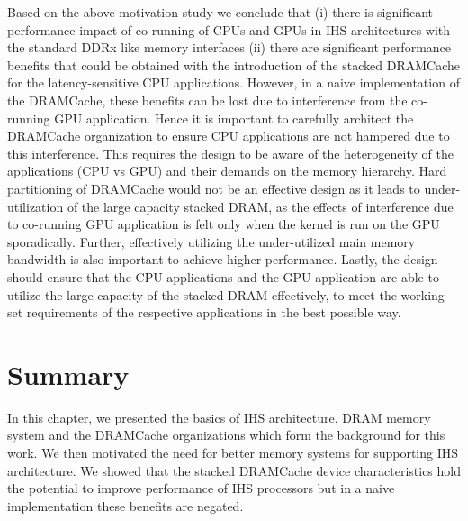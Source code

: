 \par Based on the above motivation study we conclude that (i) there is significant performance impact of co-running of CPUs and GPUs in IHS architectures with the standard DDRx like memory interfaces (ii) there are significant performance benefits that could be obtained 
with the introduction of the stacked DRAMCache for the latency-sensitive CPU applications. However, in a naive implementation
of the DRAMCache, these benefits can be lost due to interference from the co-running GPU application.  Hence it is important to carefully 
architect the DRAMCache organization to ensure CPU applications are not hampered due to this interference.
This requires the design to be aware of the heterogeneity of the applications (CPU vs GPU) and their demands on the 
memory hierarchy.  Hard partitioning of DRAMCache would not be an effective design as it leads to under-utilization of the large capacity 
stacked DRAM, as the effects of interference due to co-running GPU application is felt only when the kernel is run on the GPU sporadically. 
Further, effectively utilizing the under-utilized main memory bandwidth \cite{micro-refresh, mainak-hpca, bear}
is also important to achieve higher performance.  Lastly, the design should ensure that the CPU applications and the 
GPU application are able to utilize the large capacity of the stacked DRAM effectively, to meet the working set 
requirements of the respective applications in the best possible way.

\section{Summary}
In this chapter, we presented the basics of IHS architecture, DRAM memory system and the DRAMCache organizations which form the background for this work. We then motivated the need for better memory systems for supporting IHS architecture. We showed that the stacked DRAMCache device characteristics hold the potential to improve performance of IHS processors but in a naive implementation these benefits are negated.
